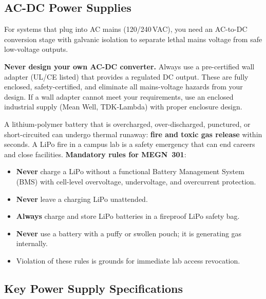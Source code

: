 \documentclass[11pt,letterpaper,twoside,openany]{book}
\begin{document}
\subsection{AC-DC Power Supplies}

For systems that plug into AC mains (120/240\,VAC), you need an AC-to-DC conversion stage with galvanic isolation to separate lethal mains voltage from safe low-voltage outputs.

\begin{warningbox}
\textbf{Never design your own AC-DC converter.} Always use a pre-certified wall adapter (UL/CE listed) that provides a regulated DC output. These are fully enclosed, safety-certified, and eliminate all mains-voltage hazards from your design. If a wall adapter cannot meet your requirements, use an enclosed industrial supply (Mean Well, TDK-Lambda) with proper enclosure design.
\end{warningbox}


\begin{warningbox}
A lithium-polymer battery that is overcharged, over-discharged, punctured, or short-circuited can undergo thermal runaway: \textbf{fire and toxic gas release} within seconds. A LiPo fire in a campus lab is a safety emergency that can end careers and close facilities. \textbf{Mandatory rules for MEGN~301}:
\begin{itemize}[nosep,leftmargin=1.5em]
\item \textbf{Never} charge a LiPo without a functional Battery Management System (BMS) with cell-level overvoltage, undervoltage, and overcurrent protection.
\item \textbf{Never} leave a charging LiPo unattended.
\item \textbf{Always} charge and store LiPo batteries in a fireproof LiPo safety bag.
\item \textbf{Never} use a battery with a puffy or swollen pouch; it is generating gas internally.
\item Violation of these rules is grounds for immediate lab access revocation.
\end{itemize}
\end{warningbox}

\subsection{Key Power Supply Specifications}
\label{sec:psu_specs}
\end{document}
